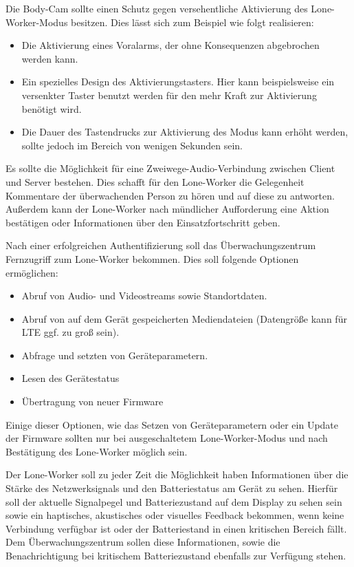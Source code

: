 \documentclass[thesis.tex]{subfiles}
\begin{document}
Die Body-Cam sollte einen Schutz gegen versehentliche Aktivierung des Lone-Worker-Modus besitzen.
Dies lässt sich zum Beispiel wie folgt realisieren:
\begin{itemize}
    \item Die Aktivierung eines Voralarms, der ohne Konsequenzen abgebrochen werden kann.
    \item Ein spezielles Design des Aktivierungstasters. Hier kann beispielsweise ein versenkter Taster benutzt werden für den mehr Kraft zur Aktivierung benötigt wird.
    \item Die Dauer des Tastendrucks zur Aktivierung des Modus kann erhöht werden, sollte jedoch im Bereich von wenigen Sekunden sein.
\end{itemize}

Es sollte die Möglichkeit für eine Zweiwege-Audio-Verbindung zwischen Client und Server bestehen.
Dies schafft für den Lone-Worker die Gelegenheit Kommentare der überwachenden Person zu hören und auf diese zu antworten.
Außerdem kann der Lone-Worker nach mündlicher Aufforderung eine Aktion bestätigen oder Informationen über den Einsatzfortschritt geben.

Nach einer erfolgreichen Authentifizierung soll das Überwachungszentrum Fernzugriff zum Lone-Worker bekommen.
Dies soll folgende Optionen ermöglichen:
\begin{itemize}
    \item Abruf von Audio- und Videostreams sowie Standortdaten.
    \item Abruf von auf dem Gerät gespeicherten Mediendateien (Datengröße kann für LTE ggf. zu groß sein).
    \item Abfrage und setzten von Geräteparametern.
    \item Lesen des Gerätestatus
    \item Übertragung von neuer Firmware
\end{itemize}

Einige dieser Optionen, wie das Setzen von Geräteparametern oder ein Update der Firmware sollten nur bei ausgeschaltetem Lone-Worker-Modus und nach Bestätigung des Lone-Worker möglich sein.

Der Lone-Worker soll zu jeder Zeit die Möglichkeit haben Informationen über die Stärke des Netzwerksignals und den Batteriestatus am Gerät zu sehen. %
Hierfür soll der aktuelle Signalpegel und Batteriezustand auf dem Display zu sehen sein sowie ein haptisches, akustisches oder visuelles Feedback bekommen, wenn keine Verbindung verfügbar ist oder der Batteriestand in einen kritischen Bereich fällt.
Dem Überwachungszentrum sollen diese Informationen, sowie die Benachrichtigung bei kritischem Batteriezustand ebenfalls zur Verfügung stehen.
\end{document}
